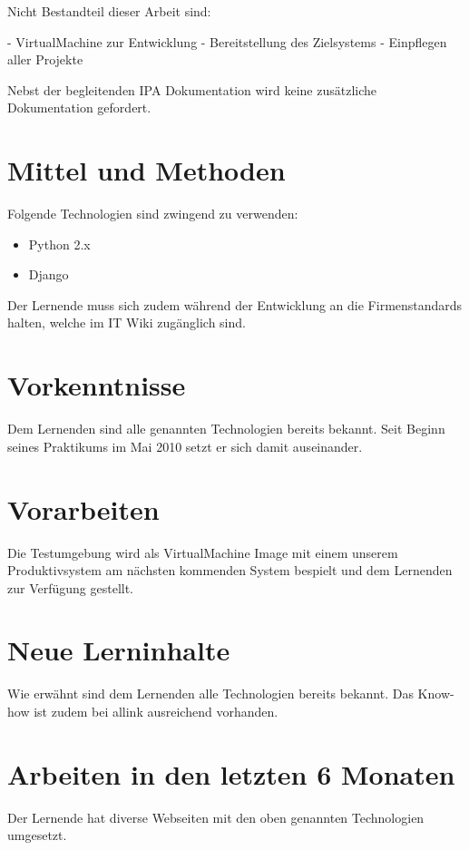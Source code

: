 Nicht Bestandteil dieser Arbeit sind:

- VirtualMachine zur Entwicklung
- Bereitstellung des Zielsystems
- Einpflegen aller Projekte

Nebst der begleitenden IPA Dokumentation wird keine zusätzliche Dokumentation gefordert.

\section{Mittel und Methoden}
Folgende Technologien sind zwingend zu verwenden:

\begin{itemize}
    \item  Python 2.x
    \item  Django
\end{itemize}

Der Lernende muss sich zudem während der Entwicklung an die Firmenstandards halten, welche im IT Wiki zugänglich sind.
    
\section{Vorkenntnisse}
Dem Lernenden sind alle genannten Technologien bereits bekannt. Seit Beginn seines Praktikums im Mai 2010 setzt er sich damit auseinander.
    
\section{Vorarbeiten}
Die Testumgebung wird als VirtualMachine Image mit einem unserem Produktivsystem am nächsten kommenden System bespielt und dem Lernenden zur Verfügung gestellt.    

\section{Neue Lerninhalte}
Wie erwähnt sind dem Lernenden alle Technologien bereits bekannt. Das Know-how ist zudem bei allink ausreichend vorhanden. 

\section{Arbeiten in den letzten 6 Monaten}
Der Lernende hat diverse Webseiten mit den oben genannten Technologien umgesetzt.
